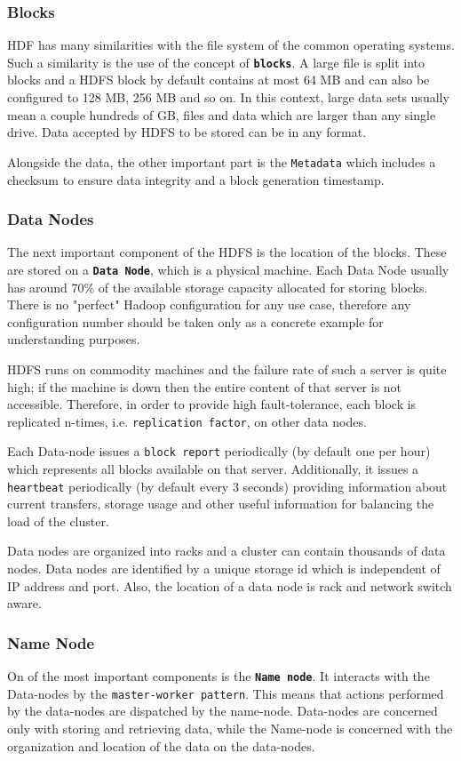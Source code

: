 \documentclass{sig-alternate}
\begin{document}
\subsubsection{Blocks}
HDF has many similarities with the file system of the common operating systems. Such a similarity is the use of the concept of \textbf{\texttt{blocks}}.
A large file is split into blocks and a HDFS block by default contains at most 64 MB and can also be configured to 128 MB, 256 MB and so on.
In this context, large data sets usually mean a couple hundreds of GB, files and data which are larger than any single drive.
Data accepted by HDFS to be stored can be in any format.

Alongside the data, the other important part is the \texttt{Metadata} which includes a checksum to ensure data integrity and a block generation timestamp.

\subsubsection{Data Nodes}
The next important component of the HDFS is the location of the blocks. These are stored on a \textbf{\texttt{Data Node}}, which is a physical machine. Each Data Node usually has around 70\% of the available storage capacity allocated for storing blocks. There is no "perfect" Hadoop configuration for any use case, therefore any configuration number should be taken only as a concrete example for understanding purposes.

HDFS runs on commodity machines and the failure rate of such a server is quite high; if the machine is down then the entire content of that server is not accessible. 
Therefore, in order to provide high fault-tolerance, each block is replicated n-times, i.e. \texttt{replication factor}, on other data nodes.

Each Data-node issues a \texttt{block report} periodically (by default one per hour) which represents all blocks available on that server.
Additionally, it issues a \texttt{heartbeat} periodically (by default every 3 seconds) providing information about current transfers, storage usage and other useful information for balancing the load of the cluster.

Data nodes are organized into racks and a cluster can contain thousands of data nodes. Data nodes are identified by a unique storage id which is independent of IP address and port. Also, the location of a data node is rack and network switch aware.

\subsubsection{Name Node}
On of the most important components is the \textbf{\texttt{Name node}}.
It interacts with the Data-nodes by the \texttt{master-worker pattern}.
This means that actions performed by the data-nodes are dispatched by the name-node. Data-nodes are concerned only with storing and retrieving data, while the Name-node is concerned with the organization and location of the data on the data-nodes.
\end{document}
